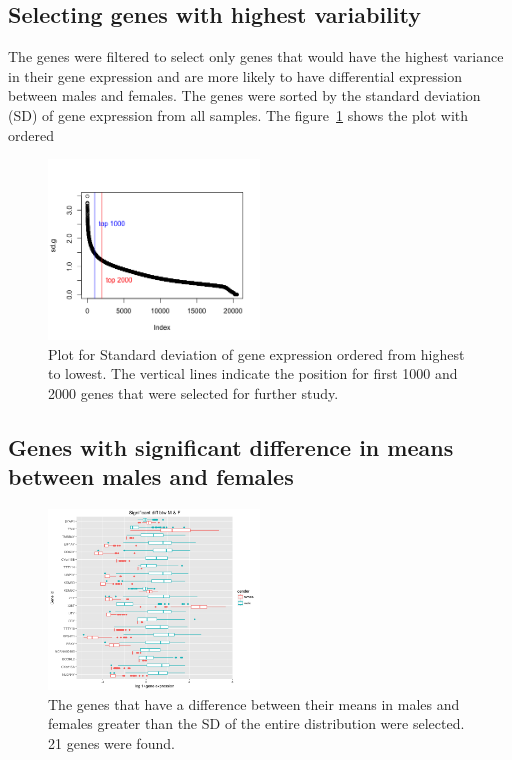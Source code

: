 \documentclass[11pt]{article} %
\begin{document}
\subsection{Selecting genes with highest variability}

The genes were filtered to select only genes that would have the highest variance in their gene expression and are more likely to have differential expression between males and females. The genes were sorted by the standard deviation (SD) of gene expression from all samples. The figure~\ref{sd-plot} shows the plot with ordered

\begin{figure}[htbp]
\centering
\includegraphics[width=0.5\textwidth]{Plots/SD-plot_top1k2k.png}
\caption{Plot for Standard deviation of gene expression ordered from highest to lowest. The vertical lines indicate the position for first 1000 and 2000 genes that were selected for further study.}
\label{sd-plot}
\end{figure}

\subsection{Genes with significant difference in means between males and females}

\begin{figure}[htbp]
\centering
\includegraphics[width=0.5\textwidth]{Plots/Signif21_genenames_boxplot.png}
\caption{The genes that have a difference between their means in males and females greater than the SD of the entire distribution were selected. 21 genes were found.}
\label{diff-mean}
\end{figure}
\end{document}
